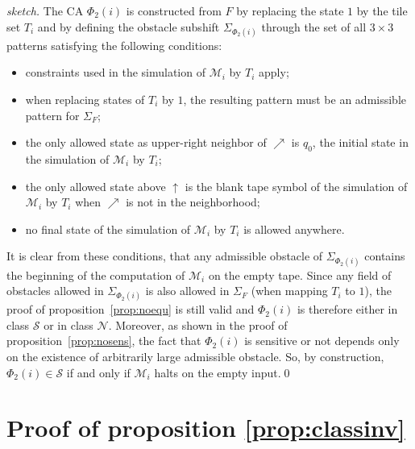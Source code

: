 \documentclass{llncs}
\newcommand{\acf}{F}
\newcommand{\obst}{\Sigma_{\acf}}
\newcommand{\oB}{\uparrow}
\newcommand{\oBL}{\nearrow}
\newcommand{\sensi}{\mathcal{S}}
\newcommand{\nono}{\mathcal{N}}
\newcommand{\phiclassdir}{\Phi_2}
\newcommand{\machine}[1]{\mathcal{M}_{#1}}
\newcommand{\obstacl}[1]{\Sigma_{#1}}
\newcommand{\tileset}[1]{T_{#1}}
\begin{document}
\begin{proof}[sketch]
  The CA $\phiclassdir(i)$ is constructed from $\acf$ by replacing the
  state $1$ by the tile set $\tileset{i}$ and by defining the obstacle
  subshift $\obstacl{\phiclassdir(i)}$ through the set of all
  ${3\times 3}$ patterns satisfying the following conditions:
  \begin{itemize}
  \item constraints used in the simulation of $\machine{i}$ by $\tileset{i}$ apply;
  \item when replacing states of $\tileset{i}$ by $1$, the resulting
    pattern must be an admissible pattern for $\obst$;
  \item the only allowed state as upper-right neighbor of $\oBL$ is
    $q_0$, the initial state in the simulation of $\machine{i}$ by
    $\tileset{i}$;
  \item the only allowed state above $\oB$ is the blank tape symbol of
    the simulation of $\machine{i}$ by $\tileset{i}$ when $\oBL$ is
    not in the neighborhood;
  \item no final state of the simulation of $\machine{i}$ by
    $\tileset{i}$ is allowed anywhere.
  \end{itemize}
  It is clear from these conditions, that any admissible obstacle of
  $\obstacl{\phiclassdir(i)}$ contains the beginning of the
  computation of $\machine{i}$ on the empty tape.  Since any field of
  obstacles allowed in $\obstacl{\phiclassdir(i)}$ is also allowed in
  $\obst$ (when mapping $\tileset{i}$ to $1$), the proof of
  proposition~\ref{prop:noequ} is still valid and $\phiclassdir(i)$ is
  therefore either in class $\sensi$ or in class $\nono$. Moreover, as
  shown in the proof of proposition~\ref{prop:nosens}, the fact that
  $\phiclassdir(i)$ is sensitive or not depends only on the existence
  of arbitrarily large admissible obstacle. So, by construction,
  $\phiclassdir(i)\in\sensi$ if and only if $\machine{i}$ halts on the
  empty input.\qed
\end{proof}



\section{Proof of proposition \ref{prop:classinv}}
\end{document}
